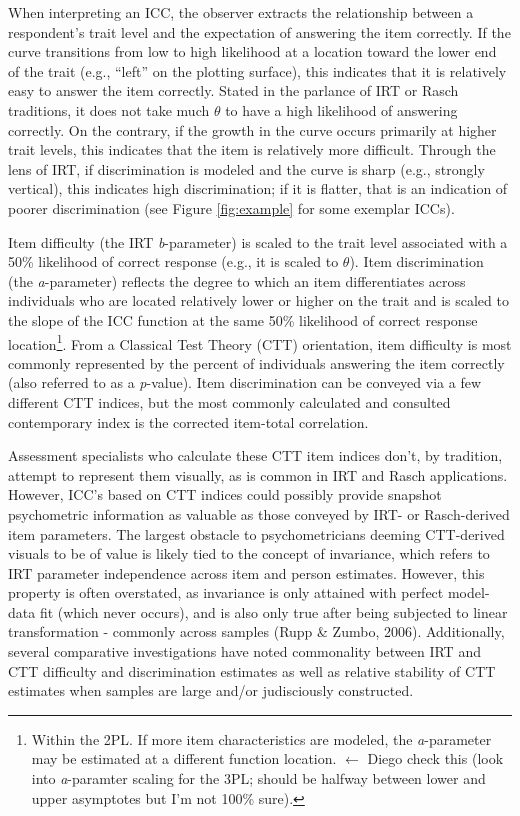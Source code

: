 \documentclass[
  man]{apa6}
\begin{document}
When interpreting an ICC, the observer extracts the relationship between a respondent's trait level and the expectation of answering the item correctly. If the curve transitions from low to high likelihood at a location toward the lower end of the trait (e.g., ``left'' on the plotting surface), this indicates that it is relatively easy to answer the item correctly. Stated in the parlance of IRT or Rasch traditions, it does not take much \(\theta\) to have a high likelihood of answering correctly. On the contrary, if the growth in the curve occurs primarily at higher trait levels, this indicates that the item is relatively more difficult. Through the lens of IRT, if discrimination is modeled and the curve is sharp (e.g., strongly vertical), this indicates high discrimination; if it is flatter, that is an indication of poorer discrimination (see Figure \ref{fig:example} for some exemplar ICCs).

Item difficulty (the IRT \emph{b}-parameter) is scaled to the trait level associated with a 50\% likelihood of correct response (e.g., it is scaled to \(\theta\)). Item discrimination (the \emph{a}-parameter) reflects the degree to which an item differentiates across individuals who are located relatively lower or higher on the trait and is scaled to the slope of the ICC function at the same 50\% likelihood of correct response location\footnote{Within the 2PL. If more item characteristics are modeled, the \emph{a}-parameter may be estimated at a different function location. \(\leftarrow\) Diego check this (look into \emph{a}-paramter scaling for the 3PL; should be halfway between lower and upper asymptotes but I'm not 100\% sure).}. From a Classical Test Theory (CTT) orientation, item difficulty is most commonly represented by the percent of individuals answering the item correctly (also referred to as a \emph{p}-value). Item discrimination can be conveyed via a few different CTT indices, but the most commonly calculated and consulted contemporary index is the corrected item-total correlation.

Assessment specialists who calculate these CTT item indices don't, by tradition, attempt to represent them visually, as is common in IRT and Rasch applications. However, ICC's based on CTT indices could possibly provide snapshot psychometric information as valuable as those conveyed by IRT- or Rasch-derived item parameters. The largest obstacle to psychometricians deeming CTT-derived visuals to be of value is likely tied to the concept of invariance, which refers to IRT parameter independence across item and person estimates. However, this property is often overstated, as invariance is only attained with perfect model-data fit (which never occurs), and is also only true after being subjected to linear transformation - commonly across samples (Rupp \& Zumbo, 2006). Additionally, several comparative investigations have noted commonality between IRT and CTT difficulty and discrimination estimates as well as relative stability of CTT estimates when samples are large and/or judisciously constructed.
\end{document}

